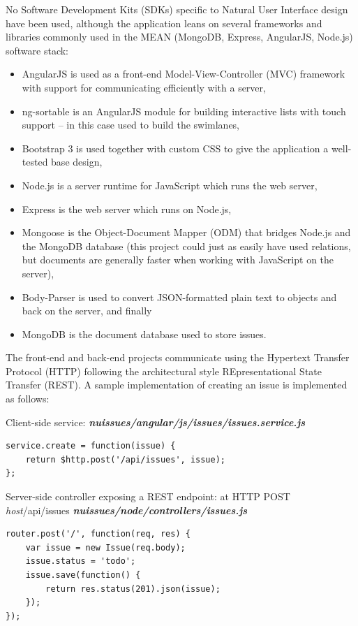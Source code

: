 No Software Development Kits (SDKs) specific to Natural User Interface design have been used, although the application leans on several frameworks and libraries commonly used in the MEAN (MongoDB, Express, AngularJS, Node.js) software stack:

\begin{itemize}
  \item AngularJS is used as a front-end Model-View-Controller (MVC) framework with support for communicating efficiently with a server,
  \item ng-sortable is an AngularJS module for building interactive lists with touch support -- in this case used to build the swimlanes,
  \item Bootstrap 3 is used together with custom CSS to give the application a well-tested base design,
  \item Node.js is a server runtime for JavaScript which runs the web server,
  \item Express is the web server which runs on Node.js,
  \item Mongoose is the Object-Document Mapper (ODM) that bridges Node.js and the MongoDB database (this project could just as easily have used relations, but documents are generally faster when working with JavaScript on the server),
  \item Body-Parser is used to convert JSON-formatted plain text to objects and back on the server, and finally
  \item MongoDB is the document database used to store issues.
\end{itemize}

The front-end and back-end projects communicate using the Hypertext Transfer Protocol (HTTP) following the architectural style REpresentational State Transfer (REST). A sample implementation of creating an issue is implemented as follows:

Client-side service: \textbf{\textit{nuissues/angular/js/issues/issues.service.js}}
\begin{lstlisting}
service.create = function(issue) {
    return $http.post('/api/issues', issue);
};
\end{lstlisting}

Server-side controller exposing a REST endpoint: at HTTP POST \textit{host}/api/issues \textbf{\textit{nuissues/node/controllers/issues.js}}
\begin{lstlisting}
router.post('/', function(req, res) {
	var issue = new Issue(req.body);
	issue.status = 'todo';
	issue.save(function() {
		return res.status(201).json(issue);
	});
});
\end{lstlisting}

